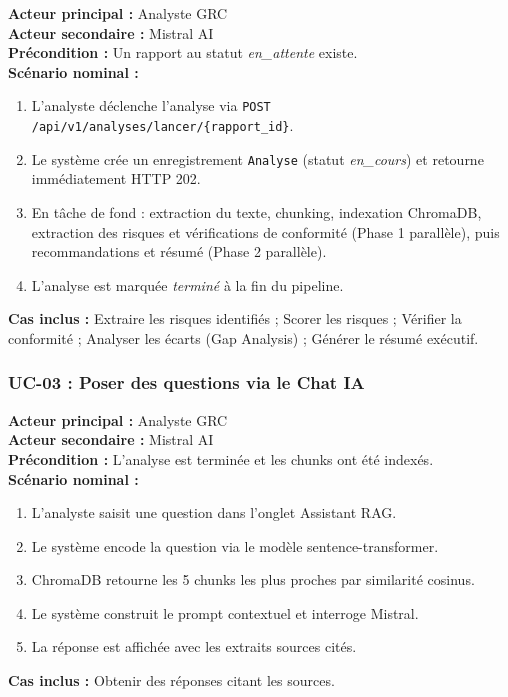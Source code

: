 \documentclass[a4paper,12pt,oneside]{report}
\begin{document}
	\begin{tcolorbox}[colback=lightgray!20, colframe=darknavy, title=UC-02 — Lancer l'analyse automatique]
		\textbf{Acteur principal :} Analyste GRC \\
		\textbf{Acteur secondaire :} Mistral AI \\
		\textbf{Précondition :} Un rapport au statut \textit{en\_attente} existe. \\
		\textbf{Scénario nominal :}
		\begin{enumerate}
			\item L'analyste déclenche l'analyse via
			\texttt{POST /api/v1/analyses/lancer/\{rapport\_id\}}.
			\item Le système crée un enregistrement \texttt{Analyse} (statut
			\textit{en\_cours}) et retourne immédiatement HTTP 202.
			\item En tâche de fond : extraction du texte, chunking, indexation
			ChromaDB, extraction des risques et vérifications de conformité
			(Phase 1 parallèle), puis recommandations et résumé (Phase 2
			parallèle).
			\item L'analyse est marquée \textit{terminé} à la fin du pipeline.
		\end{enumerate}
		\textbf{Cas inclus :} Extraire les risques identifiés ; Scorer les risques ;
		Vérifier la conformité ; Analyser les écarts (Gap Analysis) ;
		Générer le résumé exécutif.
	\end{tcolorbox}
	
	\subsubsection*{UC-03 : Poser des questions via le Chat IA}
	
	\begin{tcolorbox}[colback=lightgray!20, colframe=darknavy, title=UC-03 — Poser des questions sur le rapport (RAG Chat)]
		\textbf{Acteur principal :} Analyste GRC \\
		\textbf{Acteur secondaire :} Mistral AI \\
		\textbf{Précondition :} L'analyse est terminée et les chunks ont été indexés. \\
		\textbf{Scénario nominal :}
		\begin{enumerate}
			\item L'analyste saisit une question dans l'onglet Assistant RAG.
			\item Le système encode la question via le modèle sentence-transformer.
			\item ChromaDB retourne les 5 chunks les plus proches par similarité cosinus.
			\item Le système construit le prompt contextuel et interroge Mistral.
			\item La réponse est affichée avec les extraits sources cités.
		\end{enumerate}
		\textbf{Cas inclus :} Obtenir des réponses citant les sources.
	\end{tcolorbox}
	
\end{document}
